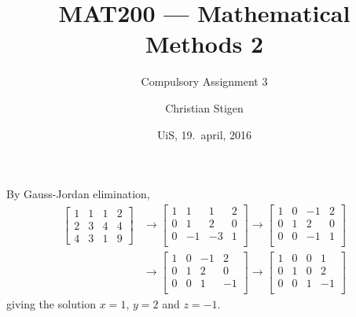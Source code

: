 \documentclass[a4paper,norsk,12pt]{article}
\title{MAT200 --- Mathematical Methods 2}
\subtitle{Compulsory Assignment 3}
\author{Christian Stigen}
\date{UiS, 19.~april, 2016}
\begin{document}
\maketitle

By Gauss-Jordan elimination,
\begin{align*}
    \left[
      \begin{array}{rrr|r}
        1 & 1 & 1 & 2 \\
        2 & 3 & 4 & 4 \\
        4 & 3 & 1 & 9
      \end{array}
    \right]
    & \rightarrow
    \left[
      \begin{array}{rrr|r}
         1 &  1 &  1 &  2 \\
         0 &  1 &  2 &  0 \\
         0 & -1 & -3 &  1 \\
      \end{array}
    \right]
    \rightarrow
    \left[
      \begin{array}{rrr|r}
         1 &  0 & -1 &  2 \\
         0 &  1 &  2 &  0 \\
         0 &  0 & -1 &  1 \\
      \end{array}
    \right]
    \\
    & \rightarrow
    \left[
      \begin{array}{rrr|r}
         1 &  0 & -1 &  2 \\
         0 &  1 &  2 &  0 \\
         0 &  0 &  1 & -1 \\
      \end{array}
    \right]
    \rightarrow
    \left[
      \begin{array}{rrr|r}
         1 &  0 &  0 &  1 \\
         0 &  1 &  0 &  2 \\
         0 &  0 &  1 & -1 \\
      \end{array}
    \right]
\end{align*}
giving the solution $x=1$, $y=2$ and $z=-1$.
\end{document}
